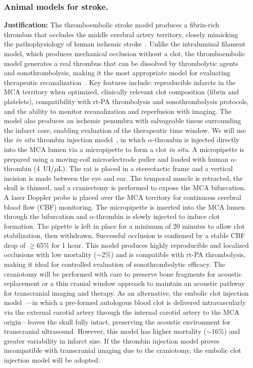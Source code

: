 \subsubsection{Animal models for stroke.}
\textbf{Justification:} The thromboembolic stroke model produces a fibrin-rich thrombus that occludes the middle cerebral artery territory, closely mimicking the pathophysiology of human ischemic stroke~\cite{orset2007mouse,niessen2003thromboembolic,carmichael2005rodent}. Unlike the intraluminal filament model, which produces mechanical occlusion without a clot, the thromboembolic model generates a real thrombus that can be dissolved by thrombolytic agents and sonothrombolysis, making it the most appropriate model for evaluating therapeutic recanalization~\cite{andjus2024preclinical}. Key features include: reproducible infarcts in the MCA territory when optimized, clinically relevant clot composition (fibrin and platelets), compatibility with rt-PA thrombolysis and sonothrombolysis protocols, and the ability to monitor recanalization and reperfusion with imaging. The model also produces an ischemic penumbra with salvageable tissue surrounding the infarct core, enabling evaluation of the therapeutic time window. We will use the \textit{in situ} thrombin injection model~\cite{orset2007mouse}, in which $\alpha$-thrombin is injected directly into the MCA lumen via a micropipette to form a clot \textit{in situ}. A micropipette is prepared using a moving-coil microelectrode puller and loaded with human $\alpha$-thrombin (4~UI/$\mu$L). The rat is placed in a stereotactic frame and a vertical incision is made between the eye and ear. The temporal muscle is retracted, the skull is thinned, and a craniectomy is performed to expose the MCA bifurcation. A laser Doppler probe is placed over the MCA territory for continuous cerebral blood flow (CBF) monitoring. The micropipette is inserted into the MCA lumen through the bifurcation and $\alpha$-thrombin is slowly injected to induce clot formation. The pipette is left in place for a minimum of 20 minutes to allow clot stabilization, then withdrawn. Successful occlusion is confirmed by a stable CBF drop of $\geq$65\% for 1 hour. This model produces highly reproducible and localized occlusions with low mortality ($\sim$2\%) and is compatible with rt-PA thrombolysis, making it ideal for controlled evaluation of sonothrombolytic efficacy. The craniotomy will be performed with care to preserve bone fragments for acoustic replacement or a thin cranial window approach to maintain an acoustic pathway for transcranial imaging and therapy. As an alternative, the embolic clot injection model~\cite{niessen2003thromboembolic}---in which a pre-formed autologous blood clot is delivered intravascularly via the external carotid artery through the internal carotid artery to the MCA origin---leaves the skull fully intact, preserving the acoustic environment for transcranial ultrasound. However, this model has higher mortality ($\sim$16\%) and greater variability in infarct size. If the thrombin injection model proves incompatible with transcranial imaging due to the craniotomy, the embolic clot injection model will be adopted.
